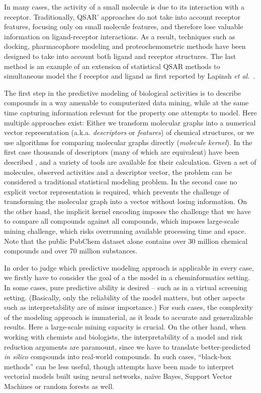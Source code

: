 \documentclass{sig-alternate}
\begin{document}
In many cases, the activity of a small molecule is due to its
interaction with a receptor. Traditionally, QSAR' \cite{Hansch:1962vn,
  Free:1964ys} approaches do not take into account receptor features,
focusing only on small molecule features, and therefore lose valuable
information on ligand-receptor interactions. As a result, techniques
such as docking, pharmacophore modeling and proteochemometric methods
have been designed to take into account both ligand and receptor
structures. The last method is an example of an extension of
statistical QSAR methods to simultaneous model the f receptor and
ligand as first reported by Lapinsh \textit{et  al.}~\cite{lapinsh2001}.

The first step in the predictive modeling of biological activities is
to describe compounds in a way amenable to computerized data mining,
while at the same time capturing information relevant for the property
one attempts to model. Here multiple approaches exist: Either we
transform molecular graphs into a numerical vector representation
(a.k.a. \emph{descriptors} or \emph{features}) of chemical structures,
or we use algorithms for comparing molecular graphs directly
(\emph{molecule kernel}). In the first case thousands of descriptors
(many of which are equivalent) have been described
\cite{todeschini2000}, and a variety of tools are available for their
calculation. Given a set of molecules, observed activities and a
descriptor vector, the problem can be considered a traditional
statistical modeling problem. In the second case no explicit vector
representation is required, which prevents the challenge of
transforming the molecular graph into a vector without losing
information. On the other hand, the implicit kernel encoding imposes
the challenge that we have to compare all compounds against all
compounds, which imposes large-scale mining challenge, which risks
overrunning available processing time and space. Note that the public
PubChem dataset alone contains over 30 million chemical compounds and
over 70 million substances.

In order to judge which predictive modeling approach is applicable in
every case, we firstly have to consider the goal of a the model in a
cheminformatics setting. In some cases, pure predictive ability is
desired -- such as in a virtual screening setting. (Basically, only
the reliability of the model matters, but other aspects such as
interpretability are of minor importance.) For such cases, the
complexity of the modeling approach is immaterial, as it leads to
accurate and generalizable results. Here a large-scale mining capacity
is crucial. On the other hand, when working with chemists and
biologists, the interpretability of a model and risk reduction
arguments are paramount, since we have to translate better-predicted
\emph{in silico} compounds into real-world compounds. In such cases,
``black-box methods'' can be less useful, though attempts have been
made to interpret vectorial models built using neural networks,
na\"{i}ve Bayes, Support Vector Machines or random forests as well.
\end{document}
